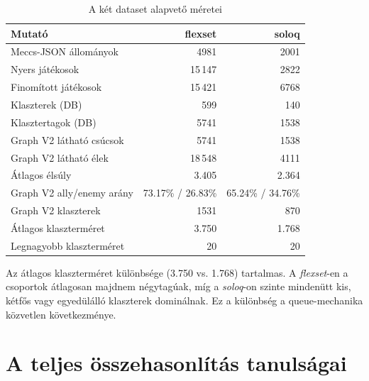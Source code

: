 \begin{table}[H]
\centering
\caption{A két dataset alapvető méretei}
\begin{tabularx}{\textwidth}{>{\raggedright\arraybackslash}p{5cm} rr}
\toprule
\textbf{Mutató} & \textbf{flexset} & \textbf{soloq} \\
\midrule
Meccs-JSON állományok & 4981 & 2001 \\
Nyers játékosok & 15\,147 & 2822 \\
Finomított játékosok & 15\,421 & 6768 \\
Klaszterek (DB) & 599 & 140 \\
Klasztertagok (DB) & 5741 & 1538 \\
Graph V2 látható csúcsok & 5741 & 1538 \\
Graph V2 látható élek & 18\,548 & 4111 \\
Átlagos élsúly & 3.405 & 2.364 \\
Graph V2 ally/enemy arány & 73.17\% / 26.83\% & 65.24\% / 34.76\% \\
Graph V2 klaszterek & 1531 & 870 \\
Átlagos klaszterméret & 3.750 & 1.768 \\
Legnagyobb klaszterméret & 20 & 20 \\
\bottomrule
\end{tabularx}
\end{table}

Az átlagos klaszterméret különbsége (3.750 vs. 1.768) tartalmas. A \textit{flexset}-en a csoportok átlagosan majdnem négytagúak, míg a \textit{soloq}-on szinte mindenütt kis, kétfős vagy egyedülálló klaszterek dominálnak. Ez a különbség a queue-mechanika közvetlen következménye.

\section{A teljes összehasonlítás tanulságai}

